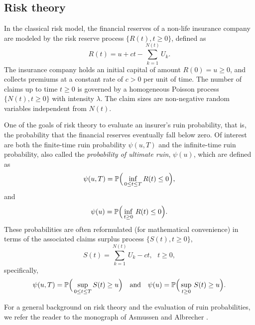 \subsection{Risk theory}
In the classical risk model, the financial reserves of a non-life insurance company are modeled by the risk reserve process $\{R(t),t\geq0\}$, defined as
\begin{equation*}\label{eq:RiskReserveProcess}
R(t)=u+ct-\sum_{k=1}^{N(t)}U_k.
\end{equation*}
The insurance company holds an initial capital of amount $R(0)=u\geq0$, and collects premiums at a constant rate of $c>0$ per unit of time. The number of claims up to time $t\geq0$ is governed by a homogeneous Poisson process $\{N(t),t\geq0\}$ with intensity $\lambda$. The claim sizes are \iid non-negative random variables independent from $N(t)$.

One of the goals of risk theory to evaluate an insurer's ruin probability, that is, the probability that the financial reserves eventually fall below zero. Of interest are both the finite-time ruin probability $\psi(u,T)$ and the infinite-time ruin probability, also called the \emph{probability of ultimate ruin}, $\psi(u)$, which are defined as
\begin{equation*}\label{eq:FiniteTimeRuinProbability}
\psi(u,T)=\P\Big( \inf_{0 \le t \le T} R(t) \leq 0 \Big),
\end{equation*}
and
\begin{equation*}\label{eq:InfiniteTimeRuinProbability}
\psi(u)=\P\Big( \inf_{t \geq 0}\,R(t) \leq 0 \Big).
\end{equation*}
These probabilities are often reformulated (for mathematical convenience) in terms of the associated claims surplus process $\{S(t),t\geq0\}$,
\begin{equation*} \label{eq:ClaimsSurplusProcess}
S(t) = \sum_{k=1}^{N(t)} U_k - ct,\text{ }t\geq0,
\end{equation*}
specifically,
\begin{equation*}
\psi(u,T)=\P\Big( \sup_{0 \le t \le T} S(t) \geq u \Big) \quad \text{and} \quad
\psi(u)=\P\Big( \sup_{t \geq 0}\,S(t) \geq u \Big).
\end{equation*}

For a general background on risk theory and the evaluation of ruin probabilities, we refer the reader to the monograph of Asmussen and Albrecher \cite{AsAl10}.

